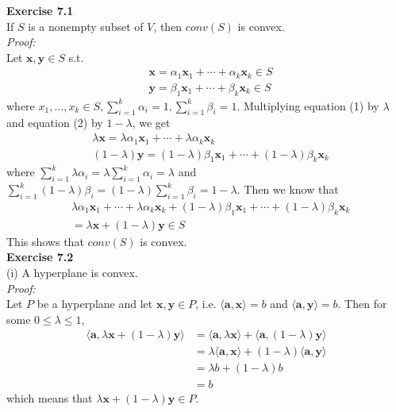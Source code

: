 \documentclass[letterpaper,12pt]{article}
\let\vec\mathbf
\theoremstyle{definition}
\begin{document}
\textbf{Exercise 7.1} \\
If $S$ is a nonempty subset of $V$, then $conv(S)$ is convex. \\
\textit{Proof:} \\
Let $\vec{x}, \vec{y} \in S$ s.t.
\begin{align}
  &\vec{x} = \alpha_1 \vec{x}_1 + \cdots + \alpha_k \vec{x}_k \in S\\
  &\vec{y} = \beta_1 \vec{x}_1 + \cdots + \beta_k \vec{x}_k \in S
\end{align}
where $x_1, ..., x_k \in S, \sum_{i=1}^k \alpha_i = 1, \sum_{i=1}^k \beta_i = 1$. Multiplying equation (1) by $\lambda$ and equation (2) by $1-\lambda$, we get
\begin{align*}
  &\lambda\vec{x} = \lambda\alpha_1 \vec{x}_1 + \cdots + \lambda\alpha_k \vec{x}_k \\
  &(1-\lambda)\vec{y} = (1-\lambda)\beta_1 \vec{x}_1 + \cdots + (1-\lambda)\beta_k \vec{x}_k
\end{align*}
where $\sum_{i=1}^k \lambda\alpha_i = \lambda\sum_{i=1}^k \alpha_i = \lambda$ and $\sum_{i=1}^k (1-\lambda)\beta_i = (1-\lambda)\sum_{i=1}^k \beta_i = 1-\lambda$. Then we know that
\begin{align*}
  & \lambda\alpha_1 \vec{x}_1 + \cdots + \lambda\alpha_k \vec{x}_k + (1-\lambda)\beta_1 \vec{x}_1 + \cdots + (1-\lambda)\beta_k \vec{x}_k \\
  &= \lambda\vec{x} + (1-\lambda)\vec{y} \in S
\end{align*}
This shows that $conv(S)$ is convex. \\

\textbf{Exercise 7.2} \\
(i) A hyperplane is convex. \\
\textit{Proof:} \\
Let $P$ be a hyperplane and let $\vec{x}, \vec{y} \in P$, i.e. $\langle \vec{a}, \vec{x} \rangle = b$ and $\langle \vec{a}, \vec{y} \rangle = b$. Then for some $0 \leq \lambda \leq 1$,
\begin{align*}
  \langle \vec{a}, \lambda \vec{x} + (1-\lambda) \vec{y} \rangle
  &= \langle \vec{a}, \lambda \vec{x} \rangle + \langle \vec{a}, (1-\lambda) \vec{y} \rangle \\
  &= \lambda \langle \vec{a}, \vec{x} \rangle + (1-\lambda) \langle \vec{a}, \vec{y} \rangle \\
  &= \lambda b + (1-\lambda) b \\
  &= b
\end{align*}
which means that $\lambda \vec{x} + (1-\lambda) \vec{y} \in P$. \\
\end{document}
